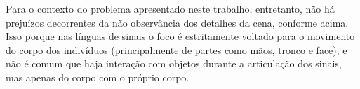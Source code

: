 Para o contexto do problema apresentado neste trabalho, entretanto, não há prejuízos decorrentes da não observância dos detalhes da cena, conforme acima. Isso porque nas línguas de sinais o foco é estritamente voltado para o movimento do corpo dos indivíduos (principalmente de partes como mãos, tronco e face), e não é comum que haja interação com objetos durante a articulação dos sinais, mas apenas do corpo com o próprio corpo.











